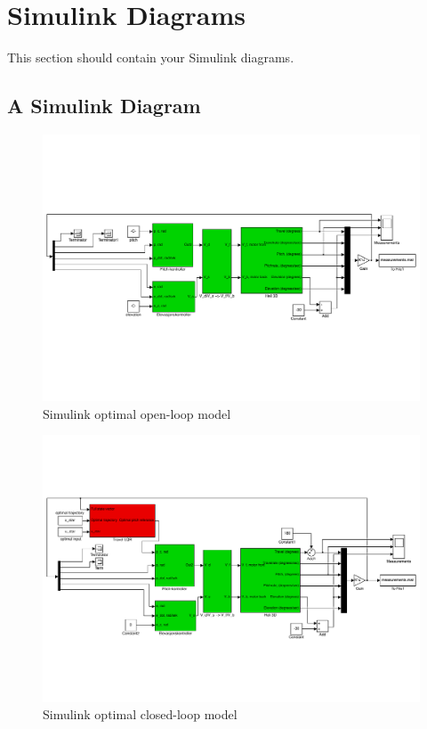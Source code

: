 \section{Simulink Diagrams}\label{sec:simulink}
This section should contain your Simulink diagrams.

\subsection{A Simulink Diagram}

\begin{figure}[htb]
	\centering
 	\includegraphics[width = \textwidth]{figures/day2/day2_mdl}
 	\caption{Simulink optimal open-loop model}
 	\label{fig:simulink_day2}
\end{figure}

\begin{figure}[htb]
	\centering
 	\includegraphics[width = \textwidth]{figures/day3/day3_mdl}
 	\caption{Simulink optimal closed-loop model}
 	\label{fig:simulink_day3}
\end{figure}

